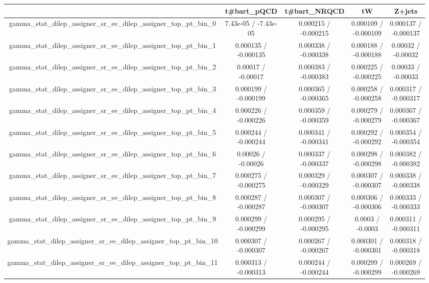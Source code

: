 \documentclass[10pt]{article}
\begin{document}
\begin{table}[htbp]
\begin{center}
\begin{tabular}{|c|c|c|c|c|}
\hline 
      & t#bar{t}_{pQCD}      & t#bar{t}_{NRQCD}      & tW      & Z+jets \\ 
\hline 
  gamma_stat_dilep_assigner_sr_ee_dilep_assigner_top_pt_bin_0 & 7.43e-05 / -7.43e-05 & 0.000215 / -0.000215 & 0.000109 / -0.000109 & 0.000137 / -0.000137 \\ 
  gamma_stat_dilep_assigner_sr_ee_dilep_assigner_top_pt_bin_1 & 0.000135 / -0.000135 & 0.000338 / -0.000338 & 0.000188 / -0.000188 & 0.00032 / -0.00032 \\ 
  gamma_stat_dilep_assigner_sr_ee_dilep_assigner_top_pt_bin_2 & 0.00017 / -0.00017 & 0.000383 / -0.000383 & 0.000225 / -0.000225 & 0.00033 / -0.00033 \\ 
  gamma_stat_dilep_assigner_sr_ee_dilep_assigner_top_pt_bin_3 & 0.000199 / -0.000199 & 0.000365 / -0.000365 & 0.000258 / -0.000258 & 0.000317 / -0.000317 \\ 
  gamma_stat_dilep_assigner_sr_ee_dilep_assigner_top_pt_bin_4 & 0.000226 / -0.000226 & 0.000359 / -0.000359 & 0.000279 / -0.000279 & 0.000367 / -0.000367 \\ 
  gamma_stat_dilep_assigner_sr_ee_dilep_assigner_top_pt_bin_5 & 0.000244 / -0.000244 & 0.000341 / -0.000341 & 0.000292 / -0.000292 & 0.000354 / -0.000354 \\ 
  gamma_stat_dilep_assigner_sr_ee_dilep_assigner_top_pt_bin_6 & 0.00026 / -0.00026 & 0.000337 / -0.000337 & 0.000298 / -0.000298 & 0.000382 / -0.000382 \\ 
  gamma_stat_dilep_assigner_sr_ee_dilep_assigner_top_pt_bin_7 & 0.000275 / -0.000275 & 0.000329 / -0.000329 & 0.000307 / -0.000307 & 0.000338 / -0.000338 \\ 
  gamma_stat_dilep_assigner_sr_ee_dilep_assigner_top_pt_bin_8 & 0.000287 / -0.000287 & 0.000307 / -0.000307 & 0.000306 / -0.000306 & 0.000333 / -0.000333 \\ 
  gamma_stat_dilep_assigner_sr_ee_dilep_assigner_top_pt_bin_9 & 0.000299 / -0.000299 & 0.000295 / -0.000295 & 0.0003 / -0.0003 & 0.000311 / -0.000311 \\ 
  gamma_stat_dilep_assigner_sr_ee_dilep_assigner_top_pt_bin_10 & 0.000307 / -0.000307 & 0.000267 / -0.000267 & 0.000301 / -0.000301 & 0.000318 / -0.000318 \\ 
  gamma_stat_dilep_assigner_sr_ee_dilep_assigner_top_pt_bin_11 & 0.000313 / -0.000313 & 0.000244 / -0.000244 & 0.000299 / -0.000299 & 0.000269 / -0.000269 \\ 

\end{tabular}
\end{center}
\end{table}
\end{document}
